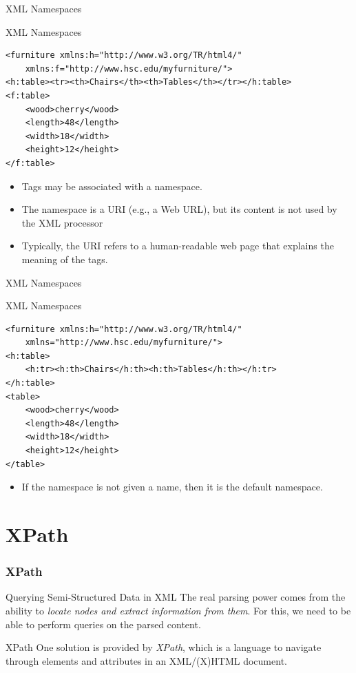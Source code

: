 \documentclass[svgnames]{beamer}
\begin{document}
\begin{frame}[fragile]{XML Namespaces}
\footnotesize
\begin{block}{XML Namespaces}
\begin{verbatim}
<furniture xmlns:h="http://www.w3.org/TR/html4/"
    xmlns:f="http://www.hsc.edu/myfurniture/">
<h:table><tr><th>Chairs</th><th>Tables</th></tr></h:table>
<f:table>
    <wood>cherry</wood>
    <length>48</length>
    <width>18</width>
    <height>12</height>
</f:table>
\end{verbatim}
\end{block}
\normalsize
\begin{itemize}
	\item Tags may be associated with a \alert{namespace}.
	\item The namespace is a URI (e.g., a Web URL), but its content is not used by the XML processor
	\item Typically, the URI refers to a human-readable web page that explains the meaning of the tags.
\end{itemize}
\end{frame}

\begin{frame}[fragile]{XML Namespaces}
\footnotesize
\begin{block}{XML Namespaces}
\begin{verbatim}
<furniture xmlns:h="http://www.w3.org/TR/html4/"
    xmlns="http://www.hsc.edu/myfurniture/">
<h:table>
    <h:tr><h:th>Chairs</h:th><h:th>Tables</h:th></h:tr>
</h:table>
<table>
    <wood>cherry</wood>
    <length>48</length>
    <width>18</width>
    <height>12</height>
</table>
\end{verbatim}
\end{block}
\normalsize
\begin{itemize}
	\item If the namespace is not given a name, then it is the default namespace.
\end{itemize}
\end{frame}

\section{XPath}


\begin{frame}[fragile]
\frametitle{XPath}

\begin{block}{Querying Semi-Structured Data in XML}
The real parsing power comes from the ability to \emph{locate nodes and extract information from them}. For this, we need to be able to perform queries on the parsed content.
\end{block}

\begin{block}{XPath}
One solution is provided by \emph{XPath}, which is a language to navigate through elements and attributes in an XML/(X)HTML document.
\end{block}

\end{frame}
\end{document}
